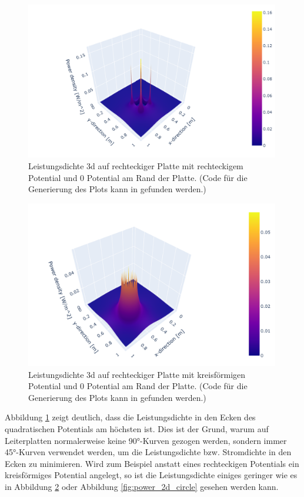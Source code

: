 \begin{figure}[h]
	\centering
	\includegraphics[width=0.99\textwidth]{papers/circuit/3d.png}
	\caption{Leistungsdichte 3d auf rechteckiger Platte mit rechteckigem Potential und 0 Potential am Rand der Platte. (Code für die Generierung des Plots kann in \cite{github:AndreasFMueller} gefunden werden.)}
	\label{fig:power_3d_rectangle}
\end{figure}
\begin{figure}[h]
	\centering
	\includegraphics[width=0.99\textwidth]{papers/circuit/3d_circle.png}
	\caption{Leistungsdichte 3d auf rechteckiger Platte mit kreisförmigen Potential und 0 Potential am Rand der Platte. (Code für die Generierung des Plots kann in \cite{github:AndreasFMueller} gefunden werden.)}
	\label{fig:power_3d_circle}
\end{figure}
Abbildung \ref{fig:power_3d_rectangle} zeigt deutlich, dass die Leistungsdichte in den Ecken des quadratischen Potentials am höchsten ist. Dies ist der Grund, warum auf Leiterplatten normalerweise keine 90°-Kurven gezogen werden, sondern immer 45°-Kurven verwendet werden, um die Leistungsdichte bzw. Stromdichte in den Ecken zu minimieren. Wird zum Beispiel anstatt eines rechteckigen Potentials ein kreisförmiges Potential angelegt, so ist die Leistungsdichte einiges geringer wie es in Abbildung \ref{fig:power_3d_circle} oder Abbildung \ref{fig:power_2d_circle} gesehen werden kann.

